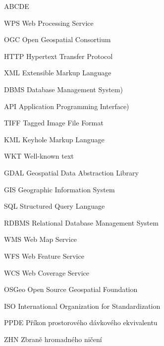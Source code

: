 
\begin{seznamzkratek}{ABCDE}
	      
	     {WPS}
	     {Web Processing Service}	  
	     
	      {OGC}
	      {Open Geospatial Consortium}
	      
	      {HTTP}
	      {Hypertext Transfer Protocol}	         
	      
		  {XML}
	      {Extensible Markup Language}

	      {DBMS}
	      {Database Management System)}
	         
	      {API}
	      {Application Programming Interface)}
	           
	      {TIFF}
	      {Tagged Image File Format}

	      {KML}
	      {Keyhole Markup Language}
	      
	      {WKT}
	      {Well-known text}	      
	      
	      {GDAL}
	      {Geospatial Data Abstraction Library}
	    
	      {GIS}
	      {Geographic Information System}
	     
	      {SQL}
	      {Structured Query Language}
	            
	      {RDBMS}
	      {Relational Database Management System}	
	      
	      {WMS}
	      {Web Map Service}	
	      
	      {WFS}
	      {Web Feature Service}     
	      
	      {WCS}
	      {Web Coverage Service}
	      	      
	      {OSGeo}
	      {Open Source Geospatial Foundation} 	  
	     	  
	      {ISO}
	      {International Organization for Standardization}
	     	  
	     	  
	     	  
	     	  
	     	  
	      {PPDE}
	      {Příkon prostorového dávkového ekvivalentu}
	     	  
	      {ZHN}
	      {Zbraně hromadného ničení}
	     	     	  

\end{seznamzkratek}
